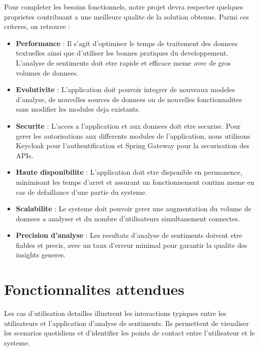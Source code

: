 Pour completer les besoins fonctionnels, notre projet devra respecter quelques proprietes contribuant a une meilleure qualite de la solution obtenue. Parmi ces criteres, on retrouve :

\begin{itemize}
    \item \textbf{Performance} : Il s'agit d'optimiser le temps de traitement des donnees textuelles ainsi que d'utiliser les bonnes pratiques du developpement. L'analyse de sentiments doit etre rapide et efficace meme avec de gros volumes de donnees.
    
    \item \textbf{Evolutivite} : L'application doit pouvoir integrer de nouveaux modeles d'analyse, de nouvelles sources de donnees ou de nouvelles fonctionnalites sans modifier les modules deja existants.
    
    \item \textbf{Securite} : L'acces a l'application et aux donnees doit etre securise. Pour gerer les autorisations aux differents modules de l'application, nous utilisons Keycloak pour l'authentification et Spring Gateway pour la securisation des APIs.
    
    \item \textbf{Haute disponibilite} : L'application doit etre disponible en permanence, minimisant les temps d'arret et assurant un fonctionnement continu meme en cas de defaillance d'une partie du systeme.
    
    \item \textbf{Scalabilite} : Le systeme doit pouvoir gerer une augmentation du volume de donnees a analyser et du nombre d'utilisateurs simultanement connectes.
    
    \item \textbf{Precision d'analyse} : Les resultats d'analyse de sentiments doivent etre fiables et precis, avec un taux d'erreur minimal pour garantir la qualite des insights generes.
\end{itemize}

\section{Fonctionnalites attendues}

Les cas d'utilisation detailles illustrent les interactions typiques entre les utilisateurs et l'application d'analyse de sentiments. Ils permettent de visualiser les scenarios quotidiens et d'identifier les points de contact entre l'utilisateur et le systeme.

